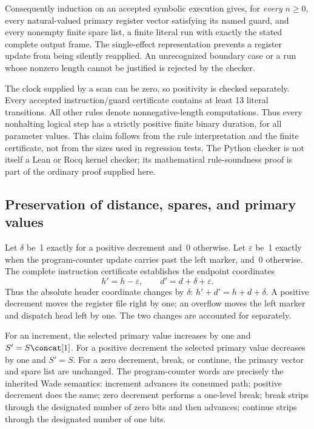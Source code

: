 Consequently induction on an accepted symbolic execution gives, for
\emph{every} $n\ge0$, every natural-valued primary register vector
satisfying its named guard, and every nonempty finite spare list, a
finite literal run with exactly the stated complete output frame.
The single-effect representation prevents a register update from being
silently reapplied.  An unrecognized boundary case or a run whose
nonzero length cannot be justified is rejected by the checker.

The clock supplied by a scan can be zero, so positivity is checked
separately.  Every accepted instruction/guard certificate contains
at least 13 literal transitions.  All other rules denote
nonnegative-length computations.  Thus every nonhalting logical
step has a strictly positive finite binary duration, for all
parameter values.  This claim follows from the rule interpretation
and the finite certificate, not from the sizes used in regression
tests.  The Python checker is not itself a Lean or Rocq kernel
checker; its mathematical rule-soundness proof is part of the
ordinary proof supplied here.

\subsection{Preservation of distance, spares, and primary values}

Let $\delta$ be~1 exactly for a positive decrement and~0 otherwise.
Let $\varepsilon$ be~1 exactly when the program-counter update carries
past the left marker, and~0 otherwise.  The complete instruction
certificate establishes the endpoint coordinates
\[
 h'=h-\varepsilon,\qquad
 d'=d+\delta+\varepsilon.
\tag{2}\label{eq:distance-update250}
\]
Thus the absolute header coordinate changes by $\delta$:
$h'+d'=h+d+\delta$.  A positive decrement moves the register file
right by one; an overflow moves the left marker and dispatch head
left by one.  The two changes are accounted for separately.

For an increment, the selected primary value increases by one and
$S'=S\concat[1]$.  For a positive decrement the selected primary value
decreases by one and $S'=S$.  For a zero decrement, break, or
continue, the primary vector and spare list are unchanged.  The
program-counter words are precisely the inherited Wade semantics:
increment advances its consumed path; positive decrement does the
same; zero decrement performs a one-level break; break strips
through the designated number of zero bits and then advances;
continue strips through the designated number of one bits.

